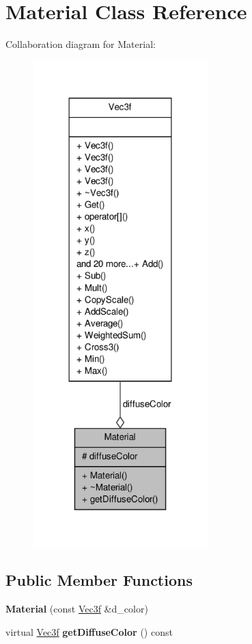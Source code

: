 \hypertarget{classMaterial}{\section{\-Material \-Class \-Reference}
\label{classMaterial}
}


\-Collaboration diagram for \-Material\-:
\nopagebreak
\begin{figure}[H]
\begin{center}
\leavevmode
\includegraphics[width=192pt]{classMaterial__coll__graph}
\end{center}
\end{figure}
\subsection*{\-Public \-Member \-Functions}
\begin{DoxyCompactItemize}
\item 
\hypertarget{classMaterial_a35eb3afb51f8d1425df2da47e8030fad}{{\bfseries \-Material} (const \hyperlink{classVec3f}{\-Vec3f} \&d\-\_\-color)}\label{classMaterial_a35eb3afb51f8d1425df2da47e8030fad}

\item 
\hypertarget{classMaterial_a83b7c9dcae7d529879d90c920892e611}{virtual \hyperlink{classVec3f}{\-Vec3f} {\bfseries get\-Diffuse\-Color} () const }\label{classMaterial_a83b7c9dcae7d529879d90c920892e611}

\end{DoxyCompactItemize}
